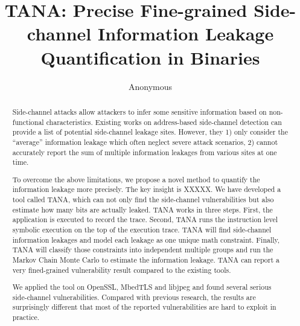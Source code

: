 \documentclass[conference]{IEEEtran}
\newcommand{\tool}{TANA}
\begin{document}
\title{\tool{}: Precise Fine-grained Side-channel Information Leakage Quantification in Binaries}
\author{Anonymous}

\maketitle

\begin{abstract}
    Side-channel attacks allow attackers to infer some sensitive 
    information based on non-functional characteristics. 
    Existing works on address-based side-channel detection 
    can provide a list of potential side-channel leakage sites. However, they 
    1) only consider the ``average'' information leakage 
    which often neglect severe attack scenarios,
    2) cannot accurately report
    the sum of multiple information leakages from various sites at one time.
       
    
    To overcome the above limitations, we propose a novel method
    to quantify the information leakage more precisely.  
    The key insight is XXXXX.
    We have developed a tool called \tool{}, which can not only 
    find the side-channel vulnerabilities but also estimate how many bits are actually leaked. 
    \tool{} works in three steps. First, the application is executed to record the 
    trace. Second, \tool{} runs the instruction level symbolic execution on the top of the 
    execution trace. \tool{} will find side-channel information leakages and model each leakage 
    as one unique math constraint. Finally, \tool{} will classify those constraints into 
    independent multiple groups and run the Markov Chain Monte Carlo to estimate the 
    information leakage. \tool{} can report a very fined-grained vulnerability result 
    compared to the existing tools.
    
    We applied the tool on OpenSSL, MbedTLS and libjpeg and found several serious side-channel 
    vulnerabilities. Compared with previous research, the results are surprisingly different 
    that most of the reported vulnerabilities are hard to exploit in practice. 

\end{abstract}

\IEEEpeerreviewmaketitle
{}















\end{document}

